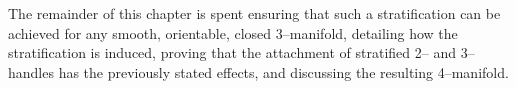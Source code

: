 The remainder of this chapter is spent ensuring that such a stratification can be achieved for any smooth, orientable, closed 3--manifold, detailing how the stratification is induced, proving that the attachment of stratified 2-- and 3--handles has the previously stated effects, and discussing the resulting 4--manifold.










